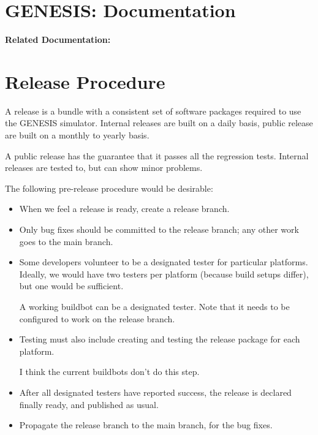 \documentclass[12pt]{article}
\begin{document}
\section*{GENESIS: Documentation}

{\bf Related Documentation:}

\section*{Release Procedure}

A release is a bundle with a consistent set of software packages
required to use the GENESIS simulator.  Internal releases are built on
a daily basis, public release are built on a monthly to yearly basis.

A public release has the guarantee that it passes all the regression
tests.  Internal releases are tested to, but can show minor problems.

The following pre-release procedure would be desirable:

\begin{itemize}
\item When we feel a release is ready, create a release branch.

\item Only bug fixes should be committed to the release branch; any
  other work goes to the main branch.

\item Some developers volunteer to be a designated tester for
  particular platforms. Ideally, we would have two testers per
  platform (because build setups differ), but one would be sufficient.

  A working buildbot can be a designated tester. Note that it needs to
  be configured to work on the release branch.
\item Testing must also include creating and testing the release
  package for each platform.

  I think the current buildbots don't do this step.

\item After all designated testers have reported success, the release
  is declared finally ready, and published as usual.

\item Propagate the release branch to the main branch, for the bug
  fixes.
\end{itemize}
\end{document}
